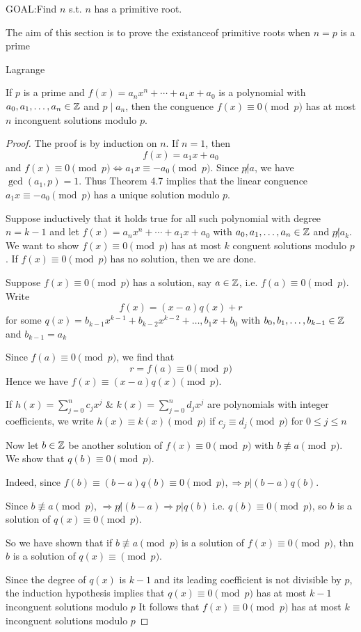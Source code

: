 GOAL:\@ Find $n$ s.t. $n$ has a primitive root.

The aim of this section is to prove the existanceof primitive roots 
when $n = p$ is a prime

\setcounter{theorem}{0}
\begin{theorem}
    Lagrange

    If $p$ is a prime and $f(x) = a_n x^n + \cdots + a_1x + a_0$
    is a polynomial with $a_0, a_1, \dots, a_n \in \mathbb{Z}$ and $p\;|\;a_n$, 
    then the conguence $f(x) \equiv 0 \pmod p$ has at most $n$ inconguent 
    solutions modulo $p$.
\end{theorem}
\begin{proof}
    The proof is by induction on $n$. If $n = 1$, then 
    \[
        f(x) = a_1 x + a_0
    \]
    and $f(x) \equiv 0 \pmod p \iff a_1 x \equiv -a_0 \pmod p$.
    Since $\displaystyle p \not| a$, we have $\gcd(a_1, p) = 1$. Thus
    Theorem 4.7 implies that the linear conguence $a_1 x\equiv -a_0 \pmod p$
    has a unique solution modulo $p$.

    Suppose inductively that it holds true for all such polynomial with degree $n = k-1$
    and let $f(x) = a_n x^n + \cdots + a_1x + a_0$ with $a_0, a_1, \dots, a_n \in \mathbb{Z}$ and
    $p \not| a_k$. We want to show $f(x) \equiv 0 \pmod p$ has at most $k$ conguent solutions
    modulo $p$.
    If $f(x) \equiv 0 \pmod p$ has no solution, then we are done.

    Suppose $f(x) \equiv 0 \pmod p$ has a solution, say $a \in \mathbb{Z}$, i.e. $f(a) \equiv 0 \pmod p$.
    Write
    \[
        f(x) = (x-a)q(x) + r
    \]
    for some $q(x) = b_{k-1} x^{k-1} + b_{k-2} x^{k-2} + \dots, b_1 x + b_0$
    with $b_0, b_1, \dots, b_{k-1} \in \mathbb{Z}$ and $b_{k-1} = a_k$

    Since $f(a) \equiv 0 \pmod p$, we find that 
    \[  
        r = f(a) \equiv 0 \pmod p
    \]
    Hence we have $f(x) \equiv (x-a)q(x) \pmod p$.

    If $h(x) = \sum_{j=0}^{n}{c_j x^j}$ \& $k(x) = \sum_{j=0}^{n}{d_j x^j}$
    are polynomials with integer coefficients, we write $h(x) \equiv k(x) \pmod p$
    if $c_j \equiv d_j \pmod p$ for $0 \leq j \leq n$

    Now let $b \in \mathbb{Z}$ be another solution of $f(x) \equiv 0 \pmod p$ with 
    $b \not\equiv a \pmod p$. We show that $q(b) \equiv 0 \pmod p$.

    Indeed, since $f(b) \equiv (b - a)q(b) \equiv 0 \pmod p, \Rightarrow p| (b-a)q(b)$.

    Since $b \not\equiv a \pmod p$, $\Rightarrow p \not| (b-a) \Rightarrow p | q(b)$
    i.e. $q(b) \equiv 0 \pmod p$, so $b$ is a solution of $q(x) \equiv 0 \pmod p$.

    So we have shown that if $b \not\equiv a \pmod p$ is a solution of $f(x) \equiv 0 \pmod p$,
    thn $b$ is a solution of $q(x) \equiv \pmod p$.

    Since the degree of $q(x)$ is $k-1$ and its leading coefficient is not divisible by $p$, the induction hypothesis
    implies that $q(x) \equiv 0 \pmod p$ has at most 
    $k-1$ inconguent solutions modulo $p$ It follows that $f(x) \equiv 0 \pmod p$ has at most $k$ inconguent solutions modulo $p$
\end{proof}